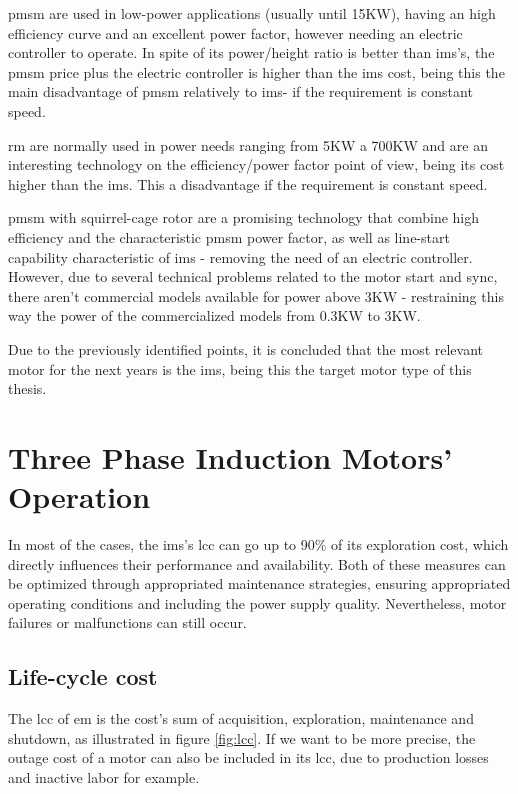 \acrshort{pmsm} are used in low-power applications (usually until 15KW), having an high efficiency curve and an excellent power factor, however needing an electric controller to operate. In spite of its power/height ratio is better than \acrshort{ims}'s, the \acrshort{pmsm} price plus the electric controller is higher than the \acrshort{ims} cost, being this the main disadvantage of \acrshort{pmsm} relatively to \acrshort{ims}- if the requirement is constant speed.

\acrshort{rm} are normally used in power needs ranging from 5KW a 700KW and are an interesting technology on the efficiency/power factor point of view, being its cost higher than the \acrshort{ims}. This a disadvantage if the requirement is constant speed.

\acrshort{pmsm} with squirrel-cage rotor are a promising technology that combine high efficiency and the characteristic \acrshort{pmsm} power factor, as well as line-start capability characteristic of \acrshort{ims} - removing the need of an electric controller.
However, due to several technical problems related to the motor start and sync, there aren't commercial models available for power above 3KW - restraining this way the power of the commercialized models from 0.3KW to 3KW.

Due to the previously identified points, it is concluded that the most relevant motor for the next years is the \acrshort{ims}, being this the target motor type of this thesis.

\section{Three Phase Induction Motors' Operation} %
\label{sec:Three_phase_induction_motors_maintenance_and_lyfe_cycle}

In most of the cases, the \acrshort{ims}'s \acrfull{lcc} can go up to 90\% of its exploration cost, which directly influences their performance and availability. Both of these measures can be optimized through appropriated maintenance strategies, ensuring appropriated operating conditions and including the power supply quality. Nevertheless, motor failures or malfunctions can still occur.

\subsection{Life-cycle cost}
\label{subsec:life_cycle_cost}

The \acrshort{lcc} of \acrshort{em} is the cost's sum of acquisition, exploration, maintenance and shutdown, as illustrated in figure \ref{fig:lcc}. If we want to be more precise, the outage cost of a motor can also be included in its \acrshort{lcc}, due to production losses and inactive labor for example.



